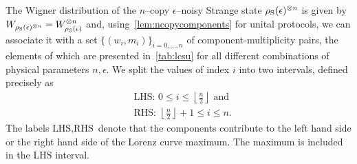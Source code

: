 \documentclass[pra,
aps,
twocolumn,
superscriptaddress,
groupedaddress,
nofootinbib,
reprint
]{revtex4-1}
\begin{document}
The Wigner distribution of the $n$--copy $\epsilon$--noisy Strange state $\rho_{\rm{S}}(\epsilon)^{\otimes n}$ is given by $\W{\rho_{\rm{S}}(\epsilon)^{\otimes n}} = W_{\rho_{\rm{S}}(\epsilon)}^{\otimes n}$ and, using~\cref{lem:ncopycomponents} for unital protocols, we can associate it with a set $\{(w_i, m_i)\}_{i=0,\dots,n}$ of component-multiplicity pairs, the elements of which are presented in~\cref{tab:lcsu} for all different combinations of physical parameters $n, \epsilon$.
We split the values of index $i$ into two intervals, defined precisely as
\begin{align}
&\text{LHS: } 0 \leq i \leq \left\lfloor \frac{n}{2} \right\rfloor \text{ and} \\
&\text{RHS: } \left\lfloor \frac{n}{2} \right\rfloor +1 \leq i \leq n.
\end{align}
The labels $\text{LHS}, \text{RHS}$ denote that the components contribute to the left hand side or the right hand side of the Lorenz curve maximum.
The maximum is included in the $\text{LHS}$ interval.
\end{document}
